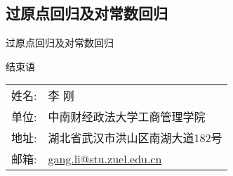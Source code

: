 \documentclass[UTF8]{ctexbeamer}
\begin{document}
\subsection{过原点回归及对常数回归}
\begin{frame}{过原点回归及对常数回归}
\end{frame}

\begin{frame}{结束语}
\linespread{1.25}
\begin{center}
\vspace{5mm}\large
\begin{tabular}{ll}
{\sc 姓名}:  & \textsf{李 刚}\\
{\sc 单位}: & 中南财经政法大学工商管理学院 \\
{\sc 地址}: & 湖北省武汉市洪山区南湖大道182号 \\
{\sc 邮箱}: & \href{mailto:gang.li@stu.zuel.edu.cn}{\color{blue}gang.li@stu.zuel.edu.cn}\\
\end{tabular}
\end{center}
\end{frame}
\end{document}
